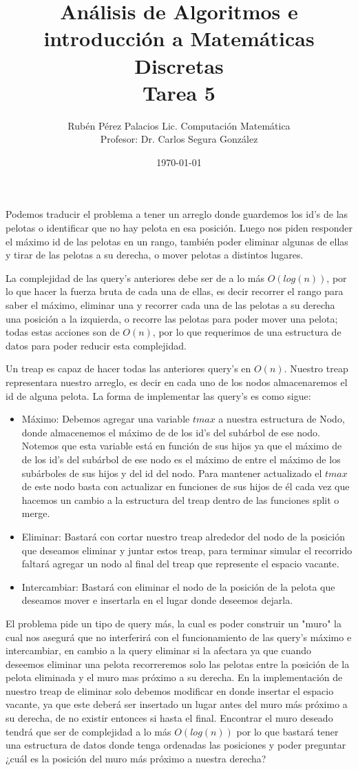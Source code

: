 \documentclass[letterpaper]{article}
\title{Análisis de Algoritmos e introducción a Matemáticas Discretas \\ Tarea 5}
\author{Rubén Pérez Palacios Lic. Computación Matemática\\Profesor: Dr. Carlos Segura González}
\date{\today}
\theoremstyle{definition}
\theoremstyle{lemathm}
\theoremstyle{lemathm}
\theoremstyle{lemathm}
\theoremstyle{lemademthm}
\newcommand{\1}{\mathbbm{1}}
\begin{document}
\maketitle

Podemos traducir el problema a tener un arreglo donde guardemos los id's de las pelotas o identificar que no hay pelota en esa posición. Luego nos piden responder el máximo id de las pelotas en un rango, también poder eliminar algunas de ellas y tirar de las pelotas a su derecha, o mover pelotas a distintos lugares.

La complejidad de las query's anteriores debe ser de a lo más $O(log(n))$, por lo que hacer la fuerza bruta de cada una de ellas, es decir recorrer el rango para saber el máximo, eliminar una y recorrer cada una de las pelotas a su derecha una posición a la izquierda, o recorre las pelotas para poder mover una pelota; todas estas acciones son de $O(n)$, por lo que requerimos de una estructura de datos para poder reducir esta complejidad.

Un treap es capaz de hacer todas las anteriores query's en $O(n)$. Nuestro treap representara nuestro arreglo, es decir en cada uno de los nodos almacenaremos el id de alguna pelota. La forma de implementar las query's es como sigue:

\begin{itemize}
	\item Máximo: Debemos agregar una variable $tmax$ a nuestra estructura de Nodo, donde almacenemos el máximo de de los id's del subárbol de ese nodo. Notemos que esta variable está en función de sus hijos ya que el máximo de de los id's del subárbol de ese nodo es el máximo de entre el máximo de los subárboles de sus hijos y del id del nodo. Para mantener actualizado el $tmax$ de este nodo basta con actualizar en funciones de sus hijos de él cada vez que hacemos un cambio a la estructura del treap dentro de las funciones split o merge.
	\item Eliminar: Bastará con cortar nuestro treap alrededor del nodo de la posición que deseamos eliminar y juntar estos treap, para terminar simular el recorrido faltará agregar un nodo al final del treap que represente el espacio vacante.
	\item Intercambiar: Bastará con eliminar el nodo de la posición de la pelota que deseamos mover e insertarla en el lugar donde deseemos dejarla.
\end{itemize}

El problema pide un tipo de query más, la cual es poder construir un "muro" la cual nos asegurá que no interferirá con el funcionamiento de las query's máximo e intercambiar, en cambio a la query eliminar si la afectara ya que cuando deseemos eliminar una pelota recorreremos solo las pelotas entre la posición de la pelota eliminada y el muro mas próximo a su derecha. En la implementación de nuestro treap de eliminar solo debemos modificar en donde insertar el espacio vacante, ya que este deberá ser insertado un lugar antes del muro más próximo a su derecha, de no existir entonces si hasta el final. Encontrar el muro deseado tendrá que ser de complejidad a lo más $O(log(n))$ por lo que bastará tener una estructura de datos donde tenga ordenadas las posiciones y poder preguntar ¿cuál es la posición del muro más próximo a nuestra derecha?
\end{document}
